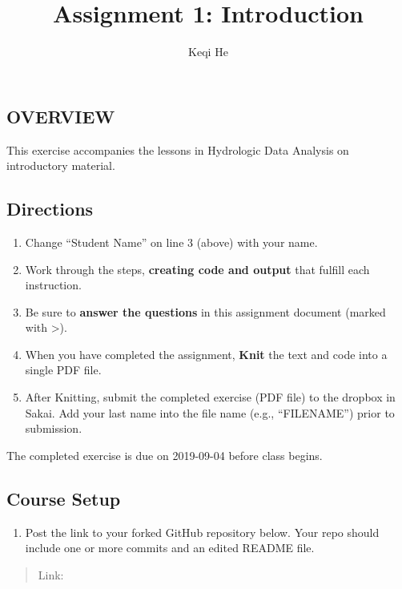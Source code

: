 \documentclass[]{article}
\title{Assignment 1: Introduction}
\author{Keqi He}
\date{}
\providecommand{\tightlist}{%
  \setlength{\itemsep}{0pt}\setlength{\parskip}{0pt}}
\begin{document}
\maketitle

\hypertarget{overview}{%
\subsection{OVERVIEW}\label{overview}}

This exercise accompanies the lessons in Hydrologic Data Analysis on
introductory material.

\hypertarget{directions}{%
\subsection{Directions}\label{directions}}

\begin{enumerate}
\def\labelenumi{\arabic{enumi}.}
\tightlist
\item
  Change ``Student Name'' on line 3 (above) with your name.
\item
  Work through the steps, \textbf{creating code and output} that fulfill
  each instruction.
\item
  Be sure to \textbf{answer the questions} in this assignment document
  (marked with \textgreater{}).
\item
  When you have completed the assignment, \textbf{Knit} the text and
  code into a single PDF file.
\item
  After Knitting, submit the completed exercise (PDF file) to the
  dropbox in Sakai. Add your last name into the file name (e.g.,
  ``FILENAME'') prior to submission.
\end{enumerate}

The completed exercise is due on 2019-09-04 before class begins.

\hypertarget{course-setup}{%
\subsection{Course Setup}\label{course-setup}}

\begin{enumerate}
\def\labelenumi{\arabic{enumi}.}
\tightlist
\item
  Post the link to your forked GitHub repository below. Your repo should
  include one or more commits and an edited README file.
\end{enumerate}

\begin{quote}
Link:
\end{quote}
\end{document}
